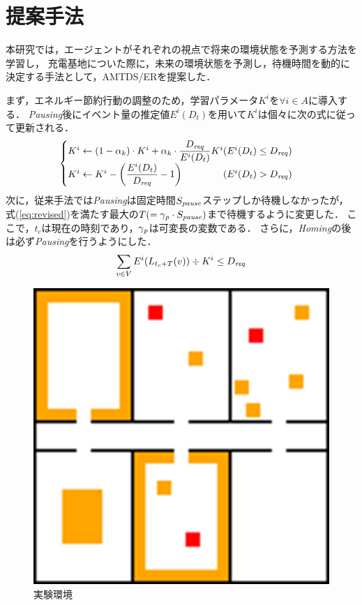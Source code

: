 \documentclass[11pt,a4j,twocolumn]{jarticle}
\def\AgentSet{A}
\def\Dreq{{D_{\it req}}}
\def\PausingInt{{S_{\it pause}}}
\def\PauseTimeFactor{{\gamma_{\it p}}}
\begin{document}
\section{提案手法}
本研究では，エージェントがそれぞれの視点で将来の環境状態を予測する方法を学習し，
充電基地についた際に，未来の環境状態を予測し，待機時間を動的に決定する手法として，AMTDS/ERを提案した．
\par

まず，エネルギー節約行動の調整のため，学習パラメータ$K^i$を$\forall i\in \AgentSet$に導入する．
{\em Pausing}後にイベント量の推定値$E^i(D_t)$を用いて$K^i$は個々に次の式に従って更新される．
%
\begin{equation}\label{eq:ParameterK}
  \begin{cases}
    K^i \gets (1 - \alpha_k) \cdot K^i + \alpha_k \cdot \dfrac{\Dreq}{E^i(D_t)}K^i 
    \hfill (E^i(D_t) \leq \Dreq)\\
    K^i \gets K^i - \left( \dfrac{E^i(D_t)}{\Dreq} - 1 \right) 
    \hfill (E^i(D_t) > \Dreq)
  \end{cases}
\end{equation}
%
次に，従来手法では{\em Pausing}は固定時間$\PausingInt$ステップしか待機しなかったが，
式(\ref{eq:revised})を満たす最大の$T (= \PauseTimeFactor\cdot\PausingInt)$まで待機するように変更した．
ここで，$t_c$は現在の時刻であり，$\PauseTimeFactor$は可変長の変数である．
さらに，{\em Homing}の後は必ず{\em Pausing}を行うようにした．
% 
\begin{equation}\label{eq:revised}
  \sum_{v \in V} E^i(L_{t_c+T}(v)) \div K^i \leq \Dreq
\end{equation} 
%

\begin{figure}
  \centering
  \includegraphics[width=0.5\hsize]{figures/Graph_Office.png}
  \caption{実験環境}
  \label{fig:env}
\end{figure}
\end{document}
